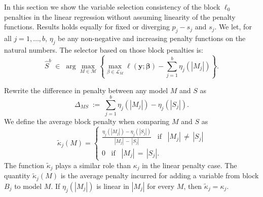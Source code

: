 \documentclass[bj,authoryear]{imsart}
\theoremstyle{plain}
\newcommand{\M}{\mathcal{M}}
\newcommand{\bs}{\boldsymbol}
\begin{document}
In this section we show the variable selection consistency of the block $\ell_0$ penalties in the linear regression without assuming linearity of the penalty functions. Results holds equally for fixed or diverging $p_j-s_j$ and $s_j$. We let, for all $j=1,\ldots,b$, $\eta_j$ be any non-negative and increasing penalty functions on the natural numbers. The selector based on those block penalties is:
\begin{equation}
  \hat S^b\;\in\;\arg\max_{M\in \M} \left\{\max_{\beta\in \mathcal{L}_M} \ell(\bs y;\bs \beta)-\sum_{j=1}^b\eta_j (|M_j|)\right\}.
\end{equation}

Rewrite the difference in penalty between any model $M$ and $S$ as
\begin{equation}\label{eq:DeltaMbis}
\Delta_{MS} \; := \; \sum_{j=1}^b \eta_j(|M_j|)-\eta_j(|S_j|).
\end{equation}
We define the average block penalty when comparing $M$ and $S$ as
\begin{equation}\label{eq:defkappatilde}
    \tilde{\kappa}_{j}(M)= \begin{cases}
     \frac{\eta_j(|M_j|)-\eta_j(|S_j|)}{|M_j|\,-\,|S_j|} \;\;\; \text{if}\;\;\; |M_j|\,\neq\,|S_j| \\
     0 \;\;\;\text{if}\;\;\; |M_j|\,=\,|S_j|.
 \end{cases}
\end{equation}
The function $\tilde{\kappa}_{j}$ plays a similar role than $\kappa_j$ in the linear penalty case. The quantity $\tilde{\kappa}_{j}(M)$ is the average penalty incurred for adding a variable from block $B_j$ to model $M$. If $\eta_j(|M_j|)$ is linear in $|M_j|$ for every $M$, then $\tilde{\kappa}_{j}= \kappa_j$.
\end{document}

